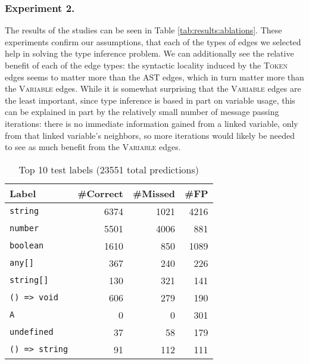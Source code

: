 \subsubsection{Experiment 2.}
The results of the studies can be seen in Table \ref{tab:results:ablations}.
These experiments confirm our assumptions, that each of the types of edges we selected help in solving the type inference problem.
We can additionally see the relative benefit of each of the edge types: the syntactic locality induced by the \textsc{Token} edges seems to matter more than the AST edges, which in turn matter more than the \textsc{Variable} edges.
While it is somewhat surprising that the \textsc{Variable} edges are the least important, since type inference is based in part on variable usage, this can be explained in part by the relatively small number of message passing iterations: there is no immediate information gained from a linked variable, only from that linked variable's neighbors, so more iterations would likely be needed to see as much benefit from the \textsc{Variable} edges.

\begin{table}
  \centering
  {\renewcommand{\arraystretch}{1.3}%
  \begin{tabular}{lrrr}
    \textbf{Label} & \textbf{\#Correct} & \textbf{\#Missed} & \textbf{\#FP} \\
    \hline
    \texttt{string} & 6374 & 1021 & 4216 \\
    \texttt{number} & 5501 & 4006 & 881 \\
    \texttt{boolean} & 1610 & 850 & 1089 \\
    \texttt{any[]} & 367 & 240 & 226 \\
    \texttt{string[]} & 130 & 321 & 141 \\
    \texttt{() => void} & 606 & 279 & 190 \\
    \texttt{A}  & 0 & 0 & 301 \\
    \texttt{undefined} & 37 & 58 & 179 \\
    \texttt{() => string} & 91 & 112 & 111
  \end{tabular}
   }
  \caption{Top 10 test labels (23551 total predictions)}\label{tab:test-fps}
\end{table}

